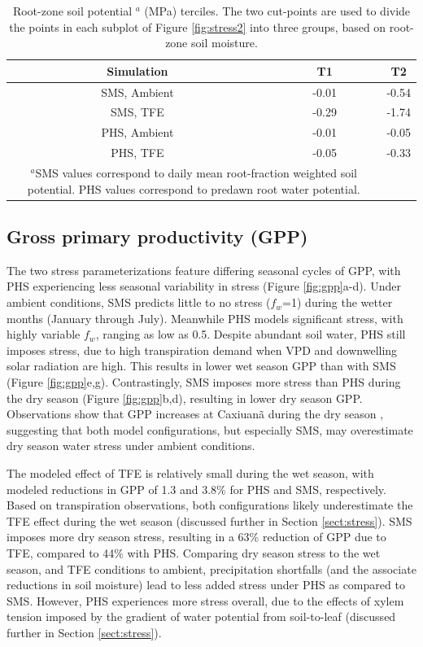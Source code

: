 \documentclass[draft,linenumbers]{agujournal}
\begin{document}
\begin{table}
\caption{Root-zone soil potential $^a$ (MPa) terciles. The two cut-points are used to divide the points in each subplot of Figure \ref{fig:stress2} into three groups, based on root-zone soil moisture.}
\label{tab:tercile}
\centering
\begin{tabular}{c c c }
Simulation & T1 & T2 \\
\hline
SMS, Ambient & -0.01 & -0.54 \\
SMS, TFE & -0.29 & -1.74 \\
PHS, Ambient & -0.01 & -0.05 \\
PHS, TFE & -0.05 & -0.33 \\
\hline
\multicolumn{2}{p{.8\linewidth}}{$^{a}$SMS values correspond to daily mean root-fraction weighted soil potential.
PHS values correspond to predawn root water potential.}
\end{tabular}
\end{table}


\subsection{Gross primary productivity (GPP)}

The two stress parameterizations feature differing seasonal cycles of GPP, with PHS experiencing less seasonal variability in stress (Figure \ref{fig:gpp}a-d).
Under ambient conditions, SMS predicts little to no stress ($f_w$=1) during the wetter months (January through July).
Meanwhile PHS models significant stress, with highly variable $f_w$, ranging as low as 0.5.
Despite abundant soil water, PHS still imposes stress, due to high transpiration demand when VPD and downwelling solar radiation are high.
This results in lower wet season GPP than with SMS (Figure \ref{fig:gpp}e,g).
Contrastingly, SMS imposes more stress than PHS during the dry season (Figure \ref{fig:gpp}b,d), 
resulting in lower dry season GPP.
Observations show that GPP increases at Caxiuan\~a during the dry season \citep{restrepo2017}, suggesting that both model configurations, 
but especially SMS, may overestimate dry season water stress under ambient conditions.  

The modeled effect of TFE is relatively small during the wet season, with modeled reductions in GPP of 1.3 and 3.8\% for PHS and SMS, respectively.
Based on transpiration observations, both configurations likely underestimate the TFE effect during the wet season (discussed further in Section \ref{sect:stress}).
SMS imposes more dry season stress, resulting in a 63\% reduction of GPP due to TFE, compared to 44\% with PHS.
Comparing dry season stress to the wet season, and TFE conditions to ambient, precipitation shortfalls (and the associate reductions in soil moisture) lead to less added stress under PHS as compared to SMS.
However, PHS experiences more stress overall, due to the effects of xylem tension imposed by the gradient of water potential from soil-to-leaf (discussed further in Section \ref{sect:stress}).
\end{document}
